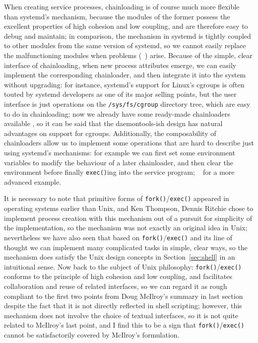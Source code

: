 When creating service processes, chainloading is of course much more flexible
than systemd's mechanism, because the modules of the former possess the
excellent properties of high cohesion and low coupling, and are therefore easy
to debug and maintain; in comparison, the mechanism in systemd is tightly
coupled to other modules from the same version of systemd, so we cannot easily
replace the malfunctioning modules when problems (\eg~\parencite{edge2017})
arise.  Because of the simple, clear interface of chainloading, when new process
attributes emerge, we can easily implement the corresponding chainloader, and
then integrate it into the system without upgrading: for instance, systemd's
support for Linux's cgroups is often touted by systemd developers as one of its
major selling points, but the user interface is just
operations on the \verb|/sys/fs/cgroup| directory tree, which are easy to do in
chainloading; now we already have some ready-made chainloaders available%
, so it can be said that the daemontools-ish design has
natural advantages on support for cgroups.  Additionally, the composability of
chainloaders allow us to implement some operations that are hard to describe
just using systemd's mechanisms: for example we can first set some environment
variables to modify the behaviour of a later chainloader, and then clear the
environment before finally \verb|exec()|ing into the service program;
\cf~\parencite{ska:syslogd} for a more advanced example.

It is necessary to note that primitive forms of \verb|fork()|/\verb|exec()|
appeared in operating systems earlier than Unix, and
Ken Thompson, Dennis Ritchie \etal{} chose to implement process creation with
this mechanism out of a pursuit for simplicity of the implementation, so the
mechanism was not exactly an original idea in Unix; nevertheless we have also
seen that based on \verb|fork()|/\verb|exec()| and its line of thought we can
implement many complicated tasks in simple, clear ways, so the mechanism does
satisfy the Unix design concepts in Section~\ref{sec:shell} in an intuitional
sense.  Now back to the subject of Unix philosophy: \verb|fork()|/\verb|exec()|
conforms to the principle of high cohesion and low coupling, and facilitates
collaboration and reuse of related interfaces, so we can regard it as rough
compliant to the first two points from Doug McIlroy's summary in last
section despite the fact that it is not directly reflected in shell
scripting; however, this mechanism does not involve the choice of
textual interfaces, so it is not quite related to McIlroy's last point,
and I find this to be a sign that \verb|fork()|/\verb|exec()| cannot
be satisfactorily covered by McIlroy's formulation.

